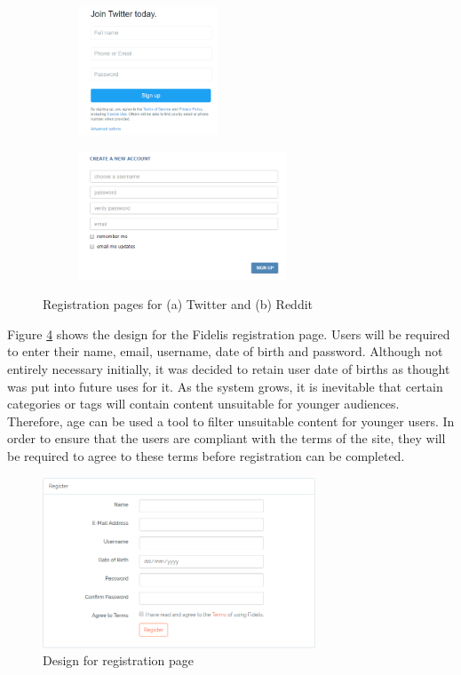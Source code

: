 \begin{figure}[H]
\centering
\begin{subfigure}[b]{.4\linewidth}
    \includegraphics[height=1.5in]{Images/Design/twitter-reg}
    \caption{}
    \label{fig:twitter-reg}
\end{subfigure}
\begin{subfigure}[b]{.5\linewidth}
    \centering
    \includegraphics[height=1.5in]{Images/Design/reddit-reg}
    \caption{}
    \label{fig:reddit-reg}
\end{subfigure}
\caption{Registration pages for (a) Twitter and (b) Reddit}
\label{fig:reg-pages}
\end{figure}

Figure \ref{fig:register-page} shows the design for the Fidelis registration page. Users will be required to enter their name, email, username, date of birth and password. Although not entirely necessary initially, it was decided to retain user date of births as thought was put into future uses for it. As the system grows, it is inevitable that certain categories or tags will contain content unsuitable for younger audiences. Therefore, age can be used a tool to filter unsuitable content for younger users. In order to ensure that the users are compliant with the terms of the site, they will be required to agree to these terms before registration can be completed.

\begin{figure}[H]
\centering
\includegraphics[height=2in]{Images/Design/register-page}
\caption{Design for registration page}
\label{fig:register-page}
\end{figure}

